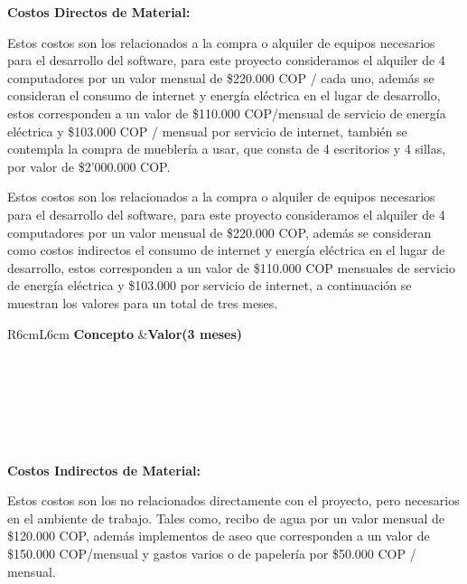 \documentclass[a4paper,12 pt]{article}
\begin{document}
\textbf{Costos Directos de Material:}

Estos costos son los relacionados a la compra o alquiler de equipos necesarios 
para el desarrollo del software, para este proyecto consideramos el alquiler de 
4 computadores \cite{02} por un valor mensual de \$220.000 COP / cada uno, además se consideran 
el consumo de internet y energía eléctrica en el lugar de desarrollo, estos corresponden a un valor de \$110.000 COP/mensual de servicio 
de energía eléctrica y \$103.000 COP / mensual por servicio de internet, también se contempla la compra de mueblería a usar, que consta de 4 escritorios y 4 sillas, por valor de \$2'000.000 COP.

Estos costos son los relacionados a la compra o alquiler de equipos necesarios 
para el desarrollo del software, para este proyecto consideramos el alquiler de 
4 computadores\cite{02} por un valor mensual de \$220.000 COP, además se consideran 
como costos indirectos el consumo de internet y energía eléctrica en el lugar de 
desarrollo, estos corresponden a un valor de \$110.000 COP mensuales de servicio 
de energía eléctrica y \$103.000 por servicio de internet, a continuación se 
muestran los valores para un total de tres meses.

\begin{table}[H]
    \centering
    \small{
    \begin{tabular}{R{6cm}L{6cm}}
        \textbf{Concepto}   &\textbf{Valor(3 meses)}\\
        \\
         \\
         \\
         \\
         \\
        \hline
         \\
    \end{tabular}
    \label{T03}}
\end{table}{}

\textbf{Costos Indirectos de Material:}

Estos costos son los no relacionados directamente con el proyecto, pero necesarios en el ambiente de trabajo.
Tales como, recibo de agua por un valor mensual de \$120.000 COP, además implementos de aseo que corresponden a un valor de \$150.000 COP/mensual y gastos varios o de papelería por \$50.000 COP / mensual.
\end{document}
